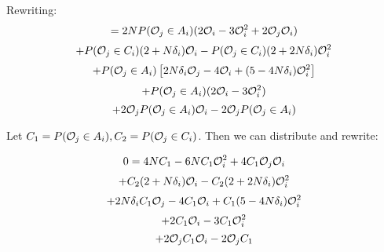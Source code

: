 \documentclass{article}
\begin{document}
Rewriting:
$$ = 2NP(\mathcal{O}_j \in A_i)(2\mathcal{O}_i - 3\mathcal{O}_i^2 + 2\mathcal{O}_j\mathcal{O}_i)$$
$$ +P(\mathcal{O}_j \in C_i) (2 + N\delta_i)\mathcal{O}_i - P(\mathcal{O}_j \in C_i)(2 + 2N\delta_i)\mathcal{O}_i^2$$
$$+ P(\mathcal{O}_j \in A_i)\left[2N\delta_i\mathcal{O}_j - 4\mathcal{O}_i + (5 - 4N\delta_i)\mathcal{O}_i^2\right]$$
$$+ P(\mathcal{O}_j \in A_i)(2\mathcal{O}_i - 3\mathcal{O}_i^2)$$
$$+ 2\mathcal{O}_jP(\mathcal{O}_j \in A_i)\mathcal{O}_i - 2\mathcal{O}_jP(\mathcal{O}_j \in A_i)$$

Let $C_1 = P(\mathcal{O}_j \in A_i), C_2 = P(\mathcal{O}_j \in C_i)$. Then we can distribute and rewrite:

$$0 = 4NC_1 - 6NC_1\mathcal{O}_i^2 + 4C_1\mathcal{O}_j\mathcal{O}_i$$
$$ + C_2(2 + N\delta_i)\mathcal{O}_i - C_2(2 + 2N\delta_i)\mathcal{O}_i^2$$
$$ + 2N\delta_i C_1 \mathcal{O}_j - 4C_1\mathcal{O}_i + C_1(5-4N\delta_i)\mathcal{O}_i^2$$
$$ + 2C_1\mathcal{O}_i - 3C_1\mathcal{O}_i^2$$
$$ + 2\mathcal{O}_j C_1 \mathcal{O}_i - 2\mathcal{O}_j C_1$$
\end{document}
